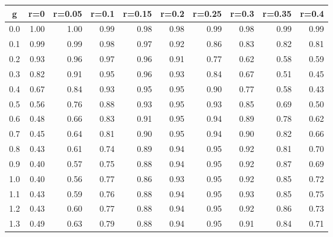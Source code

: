 %
\begin{table}[!tbp]
 \begin{center}
 \begin{tabular}{rrrrrrrrrr}\hline\hline
\multicolumn{1}{c}{g}&\multicolumn{1}{c}{r=0}&\multicolumn{1}{c}{r=0.05}&\multicolumn{1}{c}{r=0.1}&\multicolumn{1}{c}{r=0.15}&\multicolumn{1}{c}{r=0.2}&\multicolumn{1}{c}{r=0.25}&\multicolumn{1}{c}{r=0.3}&\multicolumn{1}{c}{r=0.35}&\multicolumn{1}{c}{r=0.4}\tabularnewline
\hline
0.0&1.00&1.00&0.99&0.98&0.98&0.99&0.98&0.99&0.99\tabularnewline
0.1&0.99&0.99&0.98&0.97&0.92&0.86&0.83&0.82&0.81\tabularnewline
0.2&0.93&0.96&0.97&0.96&0.91&0.77&0.62&0.58&0.59\tabularnewline
0.3&0.82&0.91&0.95&0.96&0.93&0.84&0.67&0.51&0.45\tabularnewline
0.4&0.67&0.84&0.93&0.95&0.95&0.90&0.77&0.58&0.43\tabularnewline
0.5&0.56&0.76&0.88&0.93&0.95&0.93&0.85&0.69&0.50\tabularnewline
0.6&0.48&0.66&0.83&0.91&0.95&0.94&0.89&0.78&0.62\tabularnewline
0.7&0.45&0.64&0.81&0.90&0.95&0.94&0.90&0.82&0.66\tabularnewline
0.8&0.43&0.61&0.74&0.89&0.94&0.95&0.92&0.81&0.70\tabularnewline
0.9&0.40&0.57&0.75&0.88&0.94&0.95&0.92&0.87&0.69\tabularnewline
1.0&0.40&0.56&0.77&0.86&0.93&0.95&0.92&0.85&0.72\tabularnewline
1.1&0.43&0.59&0.76&0.88&0.94&0.95&0.93&0.85&0.75\tabularnewline
1.2&0.43&0.60&0.77&0.88&0.94&0.95&0.92&0.86&0.73\tabularnewline
1.3&0.49&0.63&0.79&0.88&0.94&0.95&0.91&0.84&0.71\tabularnewline
\hline
\end{tabular}

\end{center}

\end{table}

